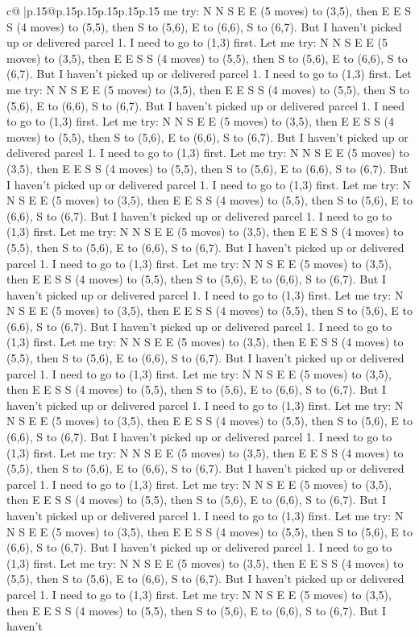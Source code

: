 \documentclass{article}
\begin{document}
{\begin{supertabular}{c@{$\;$}|p{.15\linewidth}@{}p{.15\linewidth}p{.15\linewidth}p{.15\linewidth}p{.15\linewidth}p{.15\linewidth}}
{{{me try: N N S E E (5 moves) to (3,5), then E E S S (4 moves) to (5,5), then S to (5,6), E to (6,6), S to (6,7). But I haven't picked up or delivered parcel 1. I need to go to (1,3) first. Let me try: N N S E E (5 moves) to (3,5), then E E S S (4 moves) to (5,5), then S to (5,6), E to (6,6), S to (6,7). But I haven't picked up or delivered parcel 1. I need to go to (1,3) first. Let me try: N N S E E (5 moves) to (3,5), then E E S S (4 moves) to (5,5), then S to (5,6), E to (6,6), S to (6,7). But I haven't picked up or delivered parcel 1. I need to go to (1,3) first. Let me try: N N S E E (5 moves) to (3,5), then E E S S (4 moves) to (5,5), then S to (5,6), E to (6,6), S to (6,7). But I haven't picked up or delivered parcel 1. I need to go to (1,3) first. Let me try: N N S E E (5 moves) to (3,5), then E E S S (4 moves) to (5,5), then S to (5,6), E to (6,6), S to (6,7). But I haven't picked up or delivered parcel 1. I need to go to (1,3) first. Let me try: N N S E E (5 moves) to (3,5), then E E S S (4 moves) to (5,5), then S to (5,6), E to (6,6), S to (6,7). But I haven't picked up or delivered parcel 1. I need to go to (1,3) first. Let me try: N N S E E (5 moves) to (3,5), then E E S S (4 moves) to (5,5), then S to (5,6), E to (6,6), S to (6,7). But I haven't picked up or delivered parcel 1. I need to go to (1,3) first. Let me try: N N S E E (5 moves) to (3,5), then E E S S (4 moves) to (5,5), then S to (5,6), E to (6,6), S to (6,7). But I haven't picked up or delivered parcel 1. I need to go to (1,3) first. Let me try: N N S E E (5 moves) to (3,5), then E E S S (4 moves) to (5,5), then S to (5,6), E to (6,6), S to (6,7). But I haven't picked up or delivered parcel 1. I need to go to (1,3) first. Let me try: N N S E E (5 moves) to (3,5), then E E S S (4 moves) to (5,5), then S to (5,6), E to (6,6), S to (6,7). But I haven't picked up or delivered parcel 1. I need to go to (1,3) first. Let me try: N N S E E (5 moves) to (3,5), then E E S S (4 moves) to (5,5), then S to (5,6), E to (6,6), S to (6,7). But I haven't picked up or delivered parcel 1. I need to go to (1,3) first. Let me try: N N S E E (5 moves) to (3,5), then E E S S (4 moves) to (5,5), then S to (5,6), E to (6,6), S to (6,7). But I haven't picked up or delivered parcel 1. I need to go to (1,3) first. Let me try: N N S E E (5 moves) to (3,5), then E E S S (4 moves) to (5,5), then S to (5,6), E to (6,6), S to (6,7). But I haven't picked up or delivered parcel 1. I need to go to (1,3) first. Let me try: N N S E E (5 moves) to (3,5), then E E S S (4 moves) to (5,5), then S to (5,6), E to (6,6), S to (6,7). But I haven't picked up or delivered parcel 1. I need to go to (1,3) first. Let me try: N N S E E (5 moves) to (3,5), then E E S S (4 moves) to (5,5), then S to (5,6), E to (6,6), S to (6,7). But I haven't picked up or delivered parcel 1. I need to go to (1,3) first. Let me try: N N S E E (5 moves) to (3,5), then E E S S (4 moves) to (5,5), then S to (5,6), E to (6,6), S to (6,7). But I haven't picked up or delivered parcel 1. I need to go to (1,3) first. Let me try: N N S E E (5 moves) to (3,5), then E E S S (4 moves) to (5,5), then S to (5,6), E to (6,6), S to (6,7). But I haven't }}}
\end{supertabular}}
\end{document}
